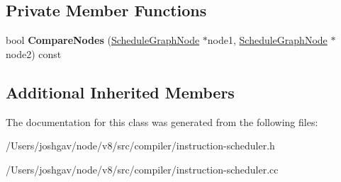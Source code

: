 \subsection*{Private Member Functions}
\begin{DoxyCompactItemize}
\item 
bool {\bfseries Compare\+Nodes} (\hyperlink{classv8_1_1internal_1_1compiler_1_1_instruction_scheduler_1_1_schedule_graph_node}{Schedule\+Graph\+Node} $\ast$node1, \hyperlink{classv8_1_1internal_1_1compiler_1_1_instruction_scheduler_1_1_schedule_graph_node}{Schedule\+Graph\+Node} $\ast$node2) const \hypertarget{classv8_1_1internal_1_1compiler_1_1_instruction_scheduler_1_1_critical_path_first_queue_a56d354c10ef3badaca7e67b7e1b4d4d7}{}\label{classv8_1_1internal_1_1compiler_1_1_instruction_scheduler_1_1_critical_path_first_queue_a56d354c10ef3badaca7e67b7e1b4d4d7}

\end{DoxyCompactItemize}
\subsection*{Additional Inherited Members}


The documentation for this class was generated from the following files\+:\begin{DoxyCompactItemize}
\item 
/\+Users/joshgav/node/v8/src/compiler/instruction-\/scheduler.\+h\item 
/\+Users/joshgav/node/v8/src/compiler/instruction-\/scheduler.\+cc\end{DoxyCompactItemize}
